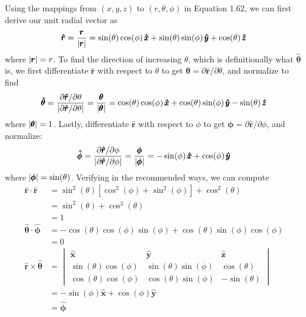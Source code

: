 \documentclass[a4paper]{article}
\begin{document}
Using the mappings from \( \!\left( x,y,z \right) \) to \( \!\left( r, \theta, \phi \right) \) in Equation 1.62, we can first derive our unit radial vector as 
\[
	\pmb{\hat{r}} = \frac{\pmb{r}}{\abs{\pmb{r}}} = \sin\!\left(\theta\right)\cos\!\left(\phi\right)\pmb{\hat{x}} + \sin\!\left(\theta\right)\sin\!\left(\phi\right)\pmb{\hat{y}} + \cos\!\left(\theta\right)\pmb{\hat{z}} 
\]
where \( \abs{\pmb{r}} = r \). To find the direction of increasing \( \theta \), which is definitionally what \( \pmb{\hat{\theta}} \) is, we first differentiate \( \pmb{\hat{r}} \) with respect to \( \theta \) to get \( \pmb{\theta} = \partial \pmb{\hat{r}} / \partial \theta \), and normalize to find
\[
	\pmb{\hat{\theta}} = \frac{\partial \pmb{\hat{r}} / \partial \theta}{\abs{\partial \pmb{\hat{r}} / \partial \theta}} = \frac{\pmb{\theta}}{\abs{\pmb{\theta}}} = \cos\!\left(\theta\right)\cos\!\left(\phi\right)\pmb{\hat{x}} + \cos\!\left(\theta\right)\sin\!\left(\phi\right)\pmb{\hat{y}} - \sin\!\left(\theta\right)\pmb{\hat{z}}
\]
where \( \abs{\pmb{\theta}} = 1 \). Lastly, differentiate \( \pmb{\hat{r}} \) with respect to \( \phi \) to get \( \pmb{\phi} = \partial \pmb{\hat{r}} / \partial \phi \), and normalize:
\[
	\pmb{\hat{\phi}} = \frac{\partial \pmb{\hat{r}} / \partial \phi}{\abs{\partial \pmb{\hat{r}} / \partial \phi}} = \frac{\pmb{\phi}}{\abs{\pmb{\phi}}} = -\sin\!\left(\phi\right)\pmb{\hat{x}} + \cos\!\left(\phi\right)\pmb{\hat{y}} 
\]
where \( \abs{\pmb{\phi}} = \sin\!\left(\theta\right) \). Verifying in the recommended ways, we can compute
\begin{align*}
	\pmb{\hat{r}} \cdot \pmb{\hat{r}} & = \sin^{2}\!\left(\theta\right)\!\left[ \cos^{2}\!\left(\phi\right) + \sin^{2}\!\left(\phi\right) \right] + \cos^{2}\!\left(\theta\right) \\
	 & = \sin^{2}\!\left(\theta\right) + \cos^{2}\!\left(\theta\right) \\ 
	 & = 1 \\
	\pmb{\hat{\theta}} \cdot \pmb{\hat{\phi}} & = -\cos\!\left(\theta\right)\cos\!\left(\phi\right)\sin\!\left(\phi\right) + \cos\!\left(\theta\right)\sin\!\left(\phi\right)\cos\!\left(\phi\right) \\
						  & = 0 \\
	\pmb{\hat{r}} \times \pmb{\hat{\theta}} & = \begin{vmatrix}
		\pmb{\hat{x}} & \pmb{\hat{y}} & \pmb{\hat{z}} \\
		\sin\!\left(\theta\right)\cos\!\left(\phi\right) & \sin\!\left(\theta\right)\sin\!\left(\phi\right) & \cos\!\left(\theta\right) \\
		\cos\!\left(\theta\right)\cos\!\left(\phi\right) & \cos\!\left(\theta\right)\sin\!\left(\phi\right) & -\sin\!\left(\theta\right)
	\end{vmatrix} \\
						& = -\sin\!\left(\phi\right)\pmb{\hat{x}} + \cos\!\left(\phi\right)\pmb{\hat{y}} \\
						& = \pmb{\hat{\phi}}
\end{align*}
\end{document}
